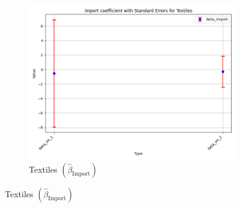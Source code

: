 \documentclass{article}
\begin{document}
\begin{figure}[ht!]
\begin{subfigure}[t]{0.32\textwidth}
        \centering
        \includegraphics[width=\textwidth]{figure/empirical_ar1_normal_kmshare_ciiu_beta_import_with_error_bars_Textiles.png}
        \caption{Textiles $(\hat{\beta}_{\text{Import}})$}
    \end{subfigure}
\end{figure}
\end{document}
